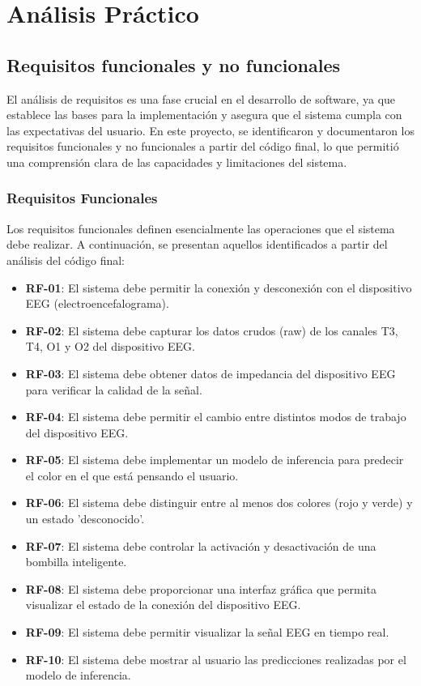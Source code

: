 \chapter{Análisis Práctico}\label{ch:practical_analytics}

\section{Requisitos funcionales y no funcionales}

El análisis de requisitos es una fase crucial en el desarrollo de software, ya que establece las bases para la implementación y asegura que el sistema cumpla con las expectativas del usuario. En este proyecto, se identificaron y documentaron los requisitos funcionales y no funcionales a partir del código final, lo que permitió una comprensión clara de las capacidades y limitaciones del sistema.

\subsection{Requisitos Funcionales}

Los requisitos funcionales definen esencialmente las operaciones que el sistema debe realizar. A continuación, se presentan aquellos identificados a partir del análisis del código final:

\begin{itemize}
    \item \textbf{RF-01}: El sistema debe permitir la conexión y desconexión con el dispositivo EEG (electroencefalograma).
    \item \textbf{RF-02}: El sistema debe capturar los datos crudos (raw) de los canales T3, T4, O1 y O2 del dispositivo EEG.
    \item \textbf{RF-03}: El sistema debe obtener datos de impedancia del dispositivo EEG para verificar la calidad de la señal.
    \item \textbf{RF-04}: El sistema debe permitir el cambio entre distintos modos de trabajo del dispositivo EEG.
    \item \textbf{RF-05}: El sistema debe implementar un modelo de inferencia para predecir el color en el que está pensando el usuario.
    \item \textbf{RF-06}: El sistema debe distinguir entre al menos dos colores (rojo y verde) y un estado 'desconocido'.
    \item \textbf{RF-07}: El sistema debe controlar la activación y desactivación de una bombilla inteligente.
    \item \textbf{RF-08}: El sistema debe proporcionar una interfaz gráfica que permita visualizar el estado de la conexión del dispositivo EEG.
    \item \textbf{RF-09}: El sistema debe permitir visualizar la señal EEG en tiempo real.
    \item \textbf{RF-10}: El sistema debe mostrar al usuario las predicciones realizadas por el modelo de inferencia.
\end{itemize}

